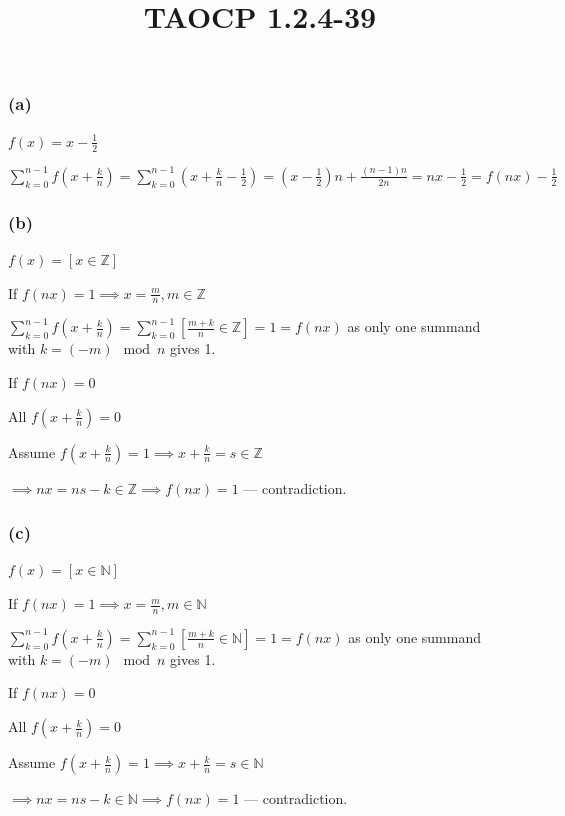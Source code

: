 \documentclass{article}
\title{TAOCP 1.2.4\mbox{-}39}
\begin{document}
\maketitle

\subsubsection*{(a)}

\( f(x) = x - \frac{1}{2} \)

\( \sum_{k=0}^{n-1} f(x+\frac{k}{n}) = \sum_{k=0}^{n-1} (x+\frac{k}{n}-\frac{1}{2}) = (x-\frac{1}{2})n + \frac{(n-1)n}{2n} = nx - \frac{1}{2} = f(nx) - \frac{1}{2} \)

\subsubsection*{(b)}

\( f(x) = [x \in \mathbb{Z}] \)

If \( f(nx) = 1 \implies x = \frac{m}{n}, m \in \mathbb{Z} \)

\( \sum_{k=0}^{n-1} f(x+\frac{k}{n}) = \sum_{k=0}^{n-1} [\frac{m+k}{n} \in \mathbb{Z}] = 1 = f(nx) \) as only one summand with \( k = (-m) \mod n \) gives 1.

If \( f(nx) = 0 \)

All \( f(x+\frac{k}{n}) = 0 \)

Assume \( f(x+\frac{k}{n}) = 1 \implies x + \frac{k}{n} = s \in \mathbb{Z} \)

\( \implies nx = ns - k \in \mathbb{Z} \implies f(nx) = 1 \) --- contradiction.

\subsubsection*{(c)}

\( f(x) = [x \in \mathbb{N}] \)

If \( f(nx) = 1 \implies x = \frac{m}{n}, m \in \mathbb{N} \)

\( \sum_{k=0}^{n-1} f(x+\frac{k}{n}) = \sum_{k=0}^{n-1} [\frac{m+k}{n} \in \mathbb{N}] = 1 = f(nx) \) as only one summand with \( k = (-m) \mod n \) gives 1.

If \( f(nx) = 0 \)

All \( f(x+\frac{k}{n}) = 0 \)

Assume \( f(x+\frac{k}{n}) = 1 \implies x + \frac{k}{n} = s \in \mathbb{N} \)

\( \implies nx = ns - k \in \mathbb{N} \implies f(nx) = 1 \) --- contradiction.
\end{document}
